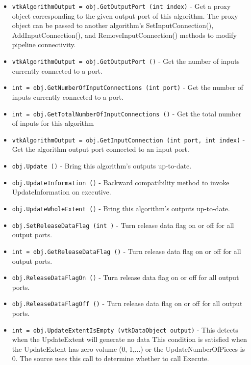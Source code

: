 \begin{itemize}
\item  \verb|vtkAlgorithmOutput = obj.GetOutputPort (int index)| -  Get a proxy object corresponding to the given output port of this
 algorithm.  The proxy object can be passed to another algorithm's
 SetInputConnection(), AddInputConnection(), and
 RemoveInputConnection() methods to modify pipeline connectivity.

\item  \verb|vtkAlgorithmOutput = obj.GetOutputPort ()| -  Get the number of inputs currently connected to a port.

\item  \verb|int = obj.GetNumberOfInputConnections (int port)| -  Get the number of inputs currently connected to a port.

\item  \verb|int = obj.GetTotalNumberOfInputConnections ()| -  Get the total number of inputs for this algorithm

\item  \verb|vtkAlgorithmOutput = obj.GetInputConnection (int port, int index)| -  Get the algorithm output port connected to an input port.

\item  \verb|obj.Update ()| -  Bring this algorithm's outputs up-to-date.

\item  \verb|obj.UpdateInformation ()| -  Backward compatibility method to invoke UpdateInformation on executive.

\item  \verb|obj.UpdateWholeExtent ()| -  Bring this algorithm's outputs up-to-date.

\item  \verb|obj.SetReleaseDataFlag (int )| -  Turn release data flag on or off for all output ports.

\item  \verb|int = obj.GetReleaseDataFlag ()| -  Turn release data flag on or off for all output ports.

\item  \verb|obj.ReleaseDataFlagOn ()| -  Turn release data flag on or off for all output ports.

\item  \verb|obj.ReleaseDataFlagOff ()| -  Turn release data flag on or off for all output ports.

\item  \verb|int = obj.UpdateExtentIsEmpty (vtkDataObject output)| -  This detects when the UpdateExtent will generate no data
 This condition is satisfied when the UpdateExtent has 
 zero volume (0,-1,...) or the UpdateNumberOfPieces is 0.
 The source uses this call to determine whether to call Execute.


\end{itemize}
